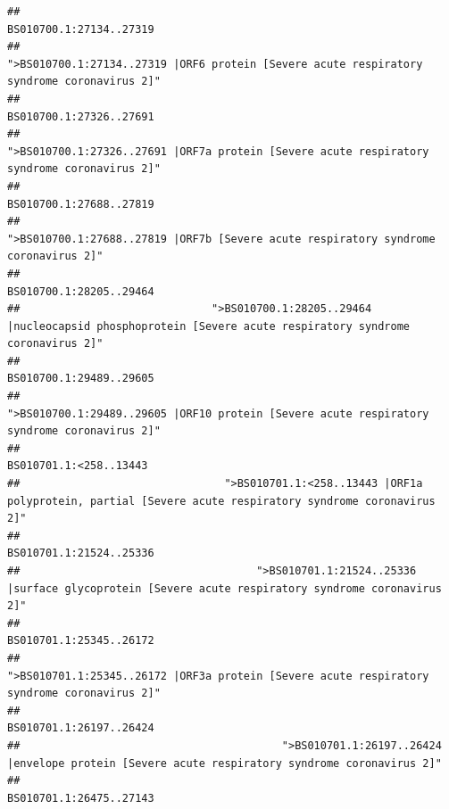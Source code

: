 \documentclass[
]{article}
\begin{document}
\begin{verbatim}
##                                                                                                                BS010700.1:27134..27319 
##                                             ">BS010700.1:27134..27319 |ORF6 protein [Severe acute respiratory syndrome coronavirus 2]" 
##                                                                                                                BS010700.1:27326..27691 
##                                            ">BS010700.1:27326..27691 |ORF7a protein [Severe acute respiratory syndrome coronavirus 2]" 
##                                                                                                                BS010700.1:27688..27819 
##                                                    ">BS010700.1:27688..27819 |ORF7b [Severe acute respiratory syndrome coronavirus 2]" 
##                                                                                                                BS010700.1:28205..29464 
##                              ">BS010700.1:28205..29464 |nucleocapsid phosphoprotein [Severe acute respiratory syndrome coronavirus 2]" 
##                                                                                                                BS010700.1:29489..29605 
##                                            ">BS010700.1:29489..29605 |ORF10 protein [Severe acute respiratory syndrome coronavirus 2]" 
##                                                                                                                 BS010701.1:<258..13443 
##                                ">BS010701.1:<258..13443 |ORF1a polyprotein, partial [Severe acute respiratory syndrome coronavirus 2]" 
##                                                                                                                BS010701.1:21524..25336 
##                                     ">BS010701.1:21524..25336 |surface glycoprotein [Severe acute respiratory syndrome coronavirus 2]" 
##                                                                                                                BS010701.1:25345..26172 
##                                            ">BS010701.1:25345..26172 |ORF3a protein [Severe acute respiratory syndrome coronavirus 2]" 
##                                                                                                                BS010701.1:26197..26424 
##                                         ">BS010701.1:26197..26424 |envelope protein [Severe acute respiratory syndrome coronavirus 2]" 
##                                                                                                                BS010701.1:26475..27143 

\end{verbatim}
\end{document}

